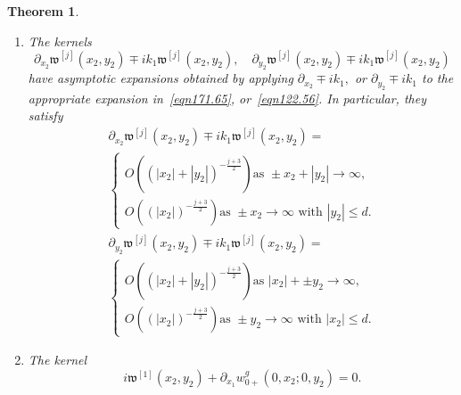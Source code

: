 \documentclass[11pt]{article}
\newcommand\fw{\mathfrak w}
\newcommand\pa{\partial}
\newtheorem{theorem}{Theorem}
\theoremstyle{definition}
\theoremstyle{remark}
\begin{document}
\begin{theorem}
\begin{enumerate}
     \item
       The kernels
       $$\pa_{x_2}\fw^{[j]}(x_2,y_2) \mp
     ik_1\fw^{[j]}(x_2,y_2),\quad\pa_{y_2}\fw^{[j]}(x_2,y_2) \mp
     ik_1\fw^{[j]}(x_2,y_2)$$
     have asymptotic expansions obtained by applying
     $\pa_{x_2}\mp ik_1,$ or $\pa_{y_2}\mp ik_1$ to the appropriate expansion
     in~\eqref{eqn171.65}, or~\eqref{eqn122.56}. In particular, they satisfy
     \begin{multline}\label{eqn173.65}
               \pa_{x_2}\fw^{[j]}(x_2,y_2) \mp
               ik_1\fw^{[j]}(x_2,y_2)=\\
               \begin{cases} O\left((|x_2|+|y_2|)^{-\frac{j+3}{2}}\right)\text{
                 as } \pm x_2+|y_2|\to\infty,\\
               O\left((|x_2|)^{-\frac{j+3}{2}}\right)\text{
                 as } \pm x_2 \to\infty \text{ with }|y_2|\leq d.
               \end{cases}
     \end{multline}
     \begin{multline}\label{eqn174.65}
               \pa_{y_2}\fw^{[j]}(x_2,y_2) \mp
               ik_1\fw^{[j]}(x_2,y_2)=\\
               \begin{cases} O\left((|x_2|+|y_2|)^{-\frac{j+3}{2}}\right)\text{
                 as }  |x_2|+\pm y_2\to\infty,\\
               O\left((|x_2|)^{-\frac{j+3}{2}}\right)\text{
                 as } \pm y_2 \to\infty \text{ with }|x_2|\leq d.
               \end{cases}
     \end{multline}
   \item The kernel
     \begin{equation}\label{eqn51.300}
          i\fw^{[1]}(x_2,y_2)+\pa_{x_1}w_{0+}^g(0,x_2;0,y_2)=0.
     \end{equation}
          \end{enumerate}
\end{theorem}
\noindent
\end{document}
